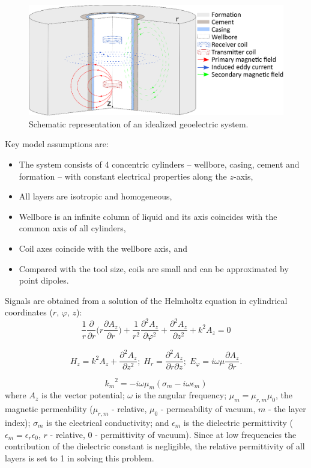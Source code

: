 \documentclass[10pt,twoside]{article}
\begin{document}
\begin{figure}[ht!]
\centering
\includegraphics[scale=1.0]{Borehole_big.eps}
\vskip2pt
\caption{Schematic representation of an idealized geoelectric system. }
\label{geoelectricmodel}
\end{figure}
Key model assumptions are:
\begin{itemize}

\item The system consists of 4 concentric cylinders -- wellbore, casing, cement and formation -- with constant electrical properties along the $z$-axis,
\item All layers are isotropic and homogeneous,
\item Wellbore is an infinite column of liquid and its axis coincides with the common axis of all cylinders,
\item Coil axes coincide with the wellbore axis, and
\item Compared with the tool size, coils are small and can be approximated by point dipoles.
\end{itemize}

Signals are obtained from a solution of the Helmholtz equation in cylindrical coordinates ($r$, $\varphi$, $z$):
\begin{equation}
\frac{1}{r} \frac{\partial}{\partial r} \Big( r \frac{\partial A_z}{\partial r} \Big) + \frac{1}{r^2}  \frac{\partial^2 A_z}{\partial \varphi^2} + \frac{\partial^2 A_z}{\partial z^2} + k^2 A_z = 0
\end{equation}

\begin{equation}
H_z = k^2 A_z + \frac{\partial^2 A_z}{\partial z^2}; \;  H_r = \frac{\partial^2 A_z}{\partial r\partial z}; \; E_\varphi = i \omega \mu \frac{\partial A_z}{\partial r}.
\end{equation}

\begin{equation}
{k_m}^2 =  - i \omega \mu_m (\sigma_m - i \omega \epsilon_m)
\end{equation}
where $A_z$  is the vector potential; $\omega$ is the angular frequency; $\mu_m = \mu_{r,m} \mu_0$, the magnetic permeability ($\mu_{r,m}$ - relative, $\mu_0$ - permeability of vacuum, $m$ - the layer index); $\sigma_m$ is the electrical conductivity; and $\epsilon_m$ is the dielectric permittivity ($\epsilon_{m}=\epsilon_r \epsilon_0$, $r$ - relative, $0$ - permittivity of vacuum). Since at low frequencies the contribution of the dielectric constant is negligible, the relative permittivity of all layers is set to 1 in solving this problem.
\end{document}
